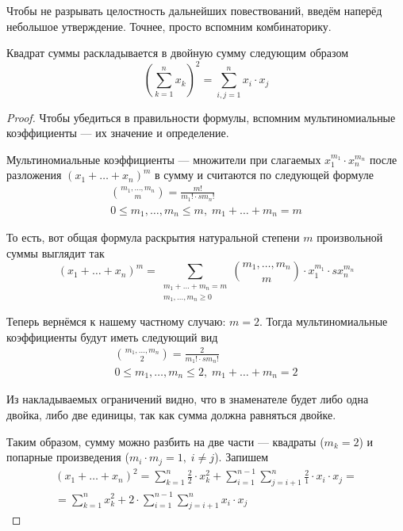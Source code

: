 Чтобы не разрывать целостность дальнейших повествований, введём наперёд
небольшое утверждение. Точнее, просто вспомним комбинаторику.
\begin{affirmation}\label{affirmation:squaredSum}
  Квадрат суммы раскладывается в двойную сумму следующим образом
  $$\left( \sum_{k=1}^n x_k \right)^2 = \sum_{i, j = 1}^{n} x_i \cdot x_j$$
\end{affirmation}
\begin{proof}
  Чтобы убедиться в правильности формулы, вспомним мультиномиальные
  коэффициенты --- их значение и определение.

  Мультиномиальные коэффициенты --- множители при слагаемых
  $x_1^{m_1} \cdot x_n^{m_n}$ после разложения
  $\left( x_1 + \dots + x_n \right)^m$ в сумму и считаются по следующей
  формуле \cite[с.~23]{Grimaldi}
  \begin{align*}
      {m_1, \dots, m_n \choose m} = \frac{m!}{m_1! \cdot s m_n!} \\
      0 \le m_1, \dots, m_n \le m,\; m_1 + \dots + m_n = m
  \end{align*}

  То есть, вот общая формула раскрытия натуральной степени $m$ произвольной
  суммы выглядит так
  $$\left( x_1 + \dots + x_n \right)^m
      = \sum_{
          \substack{m_1 + \dots + m_n = m \\
          m_1, \dots, m_n \ge 0}}
      {m_1, \dots, m_n \choose m} \cdot x_1^{m_1} \cdot s x_n^{m_n}$$

  Теперь вернёмся к нашему частному случаю: $m=2$. Тогда мультиномиальные
  коэффициенты будут иметь следующий вид
  \begin{align*}
  {m_1, \dots, m_n \choose 2} = \frac{2}{m_1! \cdot s m_n!} \\
      0 \le m_1, \dots, m_n \le 2,\; m_1 + \dots + m_n = 2
  \end{align*}

  Из накладываемых ограничений видно, что в знаменателе будет либо одна
  двойка, либо две единицы, так как сумма должна равняться двойке.

  Таким образом, сумму можно разбить на две части --- квадраты ($m_k = 2$)
  и попарные произведения ($m_i \cdot m_j = 1,\; i \neq j$). Запишем
  \begin{equation}\label{eq:squaredSumStart}
      \begin{split}
      \left( x_1 + \dots + x_n \right)^2
          = \sum_{k=1}^{n} \frac{2}{2} \cdot x_k^2
        + \sum_{i=1}^{n-1}
            \sum_{j=i+1}^n \frac{2}{1} \cdot x_i \cdot x_j = \\
          = \sum_{k=1}^{n} x_k^2
        + 2 \cdot \sum_{i=1}^{n-1} \sum_{j=i+1}^n x_i \cdot x_j
      \end{split}
  \end{equation}


\end{proof}
